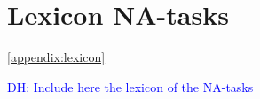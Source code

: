 \documentclass[a4paper, 11pt]{article}
\newcommand{\dieuwke}[1]{\textcolor{blue}{DH: #1}}
\begin{document}
% 

\section{Lexicon NA-tasks}\ref{appendix:lexicon}

\dieuwke{Include here the lexicon of the NA-tasks}
\end{document}

